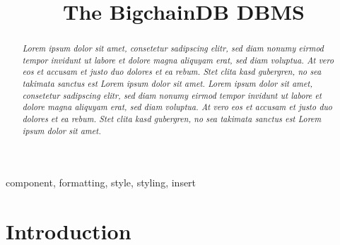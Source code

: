 \documentclass[conference]{IEEEtran}
\begin{document}
\title{The BigchainDB DBMS}

\author{
\and
{}
}

\maketitle

\begin{abstract}
\emph{Lorem ipsum dolor sit amet, consetetur sadipscing elitr, sed diam nonumy eirmod tempor invidunt ut labore et dolore magna aliquyam erat, sed diam voluptua. At vero eos et accusam et justo duo dolores et ea rebum. Stet clita kasd gubergren, no sea takimata sanctus est Lorem ipsum dolor sit amet. Lorem ipsum dolor sit amet, consetetur sadipscing elitr, sed diam nonumy eirmod tempor invidunt ut labore et dolore magna aliquyam erat, sed diam voluptua. At vero eos et accusam et justo duo dolores et ea rebum. Stet clita kasd gubergren, no sea takimata sanctus est Lorem ipsum dolor sit amet.}
\end{abstract}

\begin{IEEEkeywords}
component, formatting, style, styling, insert
\end{IEEEkeywords}

\section{Introduction}
\end{document}
